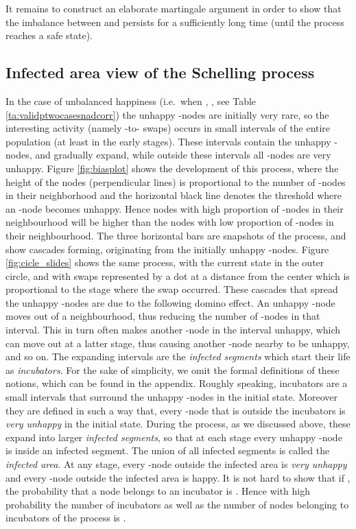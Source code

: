 \documentclass[11pt]{article}
\theoremstyle{plain}
\numberwithin{equation}{subsection}
\begin{document}
It remains to construct an elaborate martingale argument in order to show that 
the imbalance between  and 
persists for a sufficiently long time (until the process reaches a safe state). 




\subsection{Infected area view of the Schelling process}\label{subse:infareaview}
In the case of unbalanced happiness (i.e.\ when , , see Table \ref{ta:validptwocasesnadcorr})
the unhappy -nodes are initially very rare, so the interesting activity (namely -to- swaps) occurs
in small intervals of the entire population (at least in the early stages). 
These intervals contain the unhappy -nodes, and gradually expand, while outside these intervals
all -nodes are very unhappy. Figure \ref{fig:biasplot}  
shows the development of this process, where the height of the nodes (perpendicular lines) is proportional to
the number of -nodes in their neighborhood and the horizontal black line denotes the 
threshold where an -node  becomes unhappy.
Hence nodes with high proportion of -nodes in their neighbourhood
will be higher than the nodes with low proportion of -nodes in their neighbourhood. 
The three horizontal bars are snapshots of the process, and show
cascades forming, originating from the initially unhappy -nodes. 
Figure \ref{fig:cicle_slides} 
shows the same process, with the current state in the outer circle, and with swaps represented by a
dot at a distance from the center which is proportional to the stage where the swap occurred.
These cascades that spread the unhappy -nodes are due to the following domino effect. An unhappy 
-node moves out of a neighbourhood, thus reducing the number of -nodes in that interval. This
in turn often makes another -node in the interval unhappy, which can move out at a latter stage, thus
causing another -node nearby to be unhappy, and so on.
The expanding intervals are the {\em infected segments} which start their life as {\em incubators}.
For the sake of simplicity, we omit the formal definitions of these notions, which can be found in the appendix.
Roughly speaking,  incubators are a small intervals that surround  the unhappy -nodes in the initial state.
Moreover they are defined in such a way that, every -node that is outside the incubators is {\em very unhappy}
in the initial state.
During the process, as we discussed above, these expand into larger {\em infected segments}, so that at each stage
every unhappy -node is inside an infected segment.
The union of all infected segments is called the 
{\em infected area}. At any stage, every -node outside the infected area is {\em very unhappy}
and every -node outside the infected area is happy.
It is not hard to show that if , the probability that a node belongs to an incubator is
. Hence with high probability  
 the number of incubators as well as the number of nodes belonging to incubators
 of the process  is .
\end{document}
